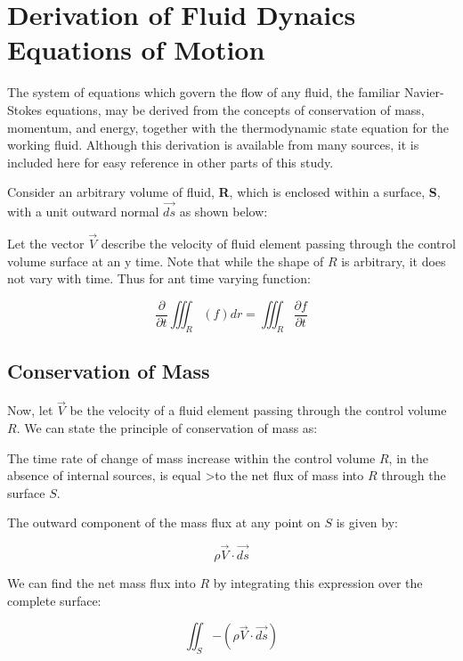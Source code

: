 \section{Derivation of Fluid Dynaics Equations of Motion}

The  system of equations which govern the flow of any fluid, the familiar
Navier-Stokes equations, may be derived from the concepts of conservation of
mass, momentum, and energy, together with the thermodynamic state equation for
the working fluid. Although this derivation is available from many sources, it
is included here for easy reference in other parts of this study.

Consider an arbitrary volume of fluid, {\bf R}, which is enclosed within a
surface, {\bf S}, with a unit outward normal {$\overrightarrow{ds}$} as shown
below:


Let the vector {$\overrightarrow{V}$} describe the velocity of fluid element
passing through the control volume surface at an y time. Note that while the
shape of $R$ is arbitrary, it does not vary with time. Thus for ant time
varying function:

\begin{equation}
\frac{\partial}{\partial t} \iiint_R (f) dr = \iiint_R \frac{\partial f}{\partial t}
\end{equation}

\subsection{Conservation of Mass}

Now, let $\overrightarrow{V}$ be the velocity of a fluid element passing
through the control volume $R$. We can state the principle of conservation of
mass as:

The time rate of change of mass increase within the control volume $R$, in
the absence of internal sources, is equal >to the net flux of mass into $R$
through the surface $S$.

The outward component of the mass flux at any point on $S$ is given by:

\begin{equation}
\rho \overrightarrow{V} \cdot \overrightarrow{ds}
\end{equation}

We can find the net mass flux into $R$ by integrating this expression over the
complete surface:

\begin{equation}
\iint_S{ - (\rho \overrightarrow{V}\cdot\overrightarrow{ds})}
\end{equation}

